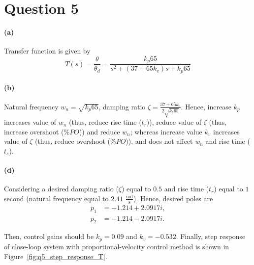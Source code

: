 \section{Question 5}
\paragraph{(a)} Transfer function is given by
\begin{equation}
T(s) = \frac{\theta}{\theta_d}= \frac{k_p 65}{s^2 + (37+65 k_v)s + k_p 65}
\end{equation}

\paragraph{(b)} Natural frequency $w_n=\sqrt{k_p 65}$, damping ratio $\zeta=\frac{37+65 k_v}{2\sqrt{k_p 65}}$. Hence, increase $k_p$ increases value of $w_n$ (thus, reduce rise time ($t_r$)), reduce value of $\zeta$ (thus, increase overshoot ($\%PO$)) and reduce $w_n$; whereas  increase value $k_v$ increases value of $\zeta$ (thus, reduce overshoot ($\%PO$)), and does not affect $w_n$ and rise time ($t_s$).


\paragraph{(d)} Considering a desired damping ratio ($\zeta$) equal to $0.5$ and rise time ($t_r$) equal to $1$ second (natural frequency equal to $2.41$ $\mathrm{\frac{rad}{s}}$). Hence, desired poles are
\begin{align*}
	p_1 &= -1.214 + 2.0917 i, \\
	p_2 &= -1.214 - 2.0917 i.
\end{align*}

Then, control gains should be $k_p =0.09$ and $k_v =-0.532$. Finally, step response of close-loop system with proportional-velocity control method is shown in Figure~\ref{fig:q5_step_response_T}.

